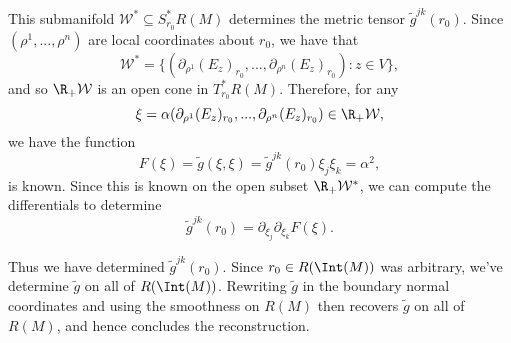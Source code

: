 This submanifold $\mathcal{W}^*\subseteq S_{r_0}^*R(M)$ determines the metric tensor $\tilde{g}^{jk}(r_0)$.  Since $(\rho^1,...,\rho^n)$ are local coordinates about $r_0$, we have that
$$\mathcal{W}^*=\{(\partial_{\rho^1}(E_z)_{r_0},...,\partial_{\rho^n}(E_z)_{r_0}):z\in V\},$$
and so $\R_+\mathcal{W}$ is an open cone in $T_{r_0}^*R(M)$.  Therefore, for any
$$\xi=\alpha(\partial_{\rho^1}(E_z)_{r_0},...,\partial_{\rho^n}(E_z)_{r_0})\in\R_+\mathcal{W},$$
we have the function
$$F(\xi)=\tilde{g}(\xi,\xi)=\tilde{g}^{jk}(r_0)\xi_j\xi_k=\alpha^2,$$
is known.  Since this is known on the open subset $\R_+\mathcal{W}^*$, we can compute the differentials to determine
$$\tilde{g}^{jk}(r_0)=\partial_{\xi_j}\partial_{\xi_k}F(\xi).$$

Thus we have determined $\tilde{g}^{jk}(r_0)$.  Since $r_0\in R(\Int(M))$ was arbitrary, we've determine $\tilde{g}$ on all of $R(\Int(M))$.  Rewriting $\tilde{g}$ in the boundary normal coordinates and using the smoothness on $R(M)$ then recovers $\tilde{g}$ on all of $R(M)$, and hence concludes the reconstruction.





























































